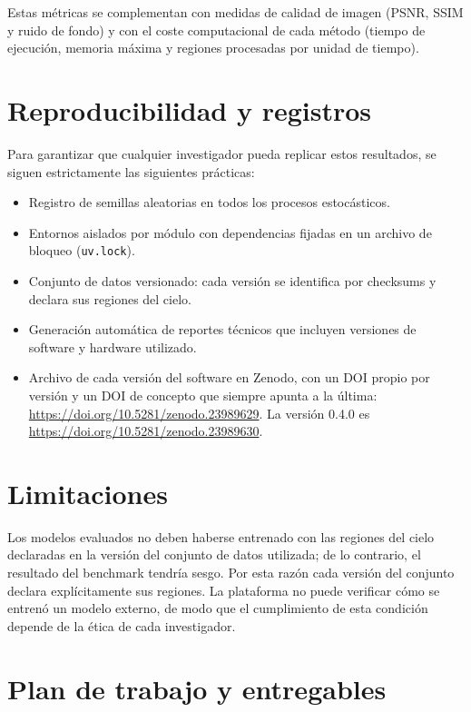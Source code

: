 Estas m\'etricas se complementan con medidas de calidad de imagen (PSNR, SSIM y ruido de fondo) y con el coste computacional de cada m\'etodo (tiempo de ejecuci\'on, memoria m\'axima y regiones procesadas por unidad de tiempo).

\section{Reproducibilidad y registros}

Para garantizar que cualquier investigador pueda replicar estos resultados, se siguen estrictamente las siguientes pr\'acticas:
\begin{itemize}
  \item Registro de semillas aleatorias en todos los procesos estoc\'asticos.
  \item Entornos aislados por m\'odulo con dependencias fijadas en un archivo de bloqueo (\texttt{uv.lock}).
  \item Conjunto de datos versionado: cada versi\'on se identifica por checksums y declara sus regiones del cielo.
  \item Generaci\'on autom\'atica de reportes t\'ecnicos que incluyen versiones de software y hardware utilizado.
  \item Archivo de cada versi\'on del software en Zenodo, con un DOI propio por versi\'on y un DOI de concepto que siempre apunta a la \'ultima: \url{https://doi.org/10.5281/zenodo.23989629}. La versi\'on 0.4.0 es \url{https://doi.org/10.5281/zenodo.23989630}.
\end{itemize}

\section{Limitaciones}

Los modelos evaluados no deben haberse entrenado con las regiones del cielo declaradas en la versi\'on del conjunto de datos utilizada; de lo contrario, el resultado del benchmark tendr\'ia sesgo. Por esta raz\'on cada versi\'on del conjunto declara expl\'icitamente sus regiones. La plataforma no puede verificar c\'omo se entren\'o un modelo externo, de modo que el cumplimiento de esta condici\'on depende de la \'etica de cada investigador.

\section{Plan de trabajo y entregables}

